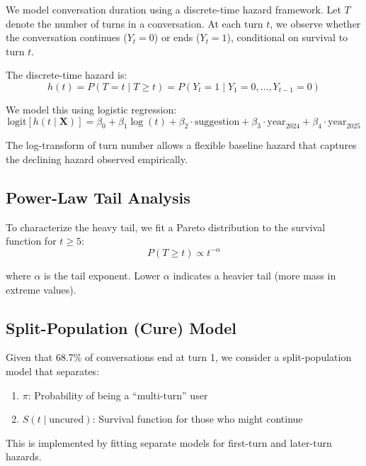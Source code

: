 \documentclass[11pt]{article}
\begin{document}
We model conversation duration using a discrete-time hazard framework. Let $T$ denote the number of turns in a conversation. At each turn $t$, we observe whether the conversation continues ($Y_t = 0$) or ends ($Y_t = 1$), conditional on survival to turn $t$.

The discrete-time hazard is:
\begin{equation}
h(t) = P(T = t \mid T \geq t) = P(Y_t = 1 \mid Y_1 = 0, \ldots, Y_{t-1} = 0)
\end{equation}

We model this using logistic regression:
\begin{equation}
\text{logit}[h(t \mid \mathbf{X})] = \beta_0 + \beta_1 \log(t) + \beta_2 \cdot \text{suggestion} + \beta_3 \cdot \text{year}_{2024} + \beta_4 \cdot \text{year}_{2025}
\end{equation}

The log-transform of turn number allows a flexible baseline hazard that captures the declining hazard observed empirically.

\subsection{Power-Law Tail Analysis}

To characterize the heavy tail, we fit a Pareto distribution to the survival function for $t \geq 5$:
\begin{equation}
P(T \geq t) \propto t^{-\alpha}
\end{equation}

where $\alpha$ is the tail exponent. Lower $\alpha$ indicates a heavier tail (more mass in extreme values).

\subsection{Split-Population (Cure) Model}

Given that 68.7\% of conversations end at turn 1, we consider a split-population model that separates:
\begin{enumerate}
    \item $\pi$: Probability of being a ``multi-turn'' user
    \item $S(t \mid \text{uncured})$: Survival function for those who might continue
\end{enumerate}

This is implemented by fitting separate models for first-turn and later-turn hazards.
\end{document}
